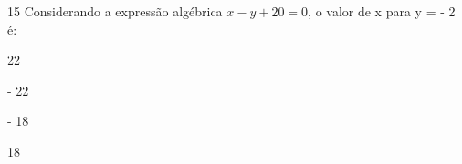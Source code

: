 
\num{15} Considerando a expressão algébrica $x - y + 20 = 0$, o valor de x
para y = - 2 é:

\begin{escolha}
\item 22
\item - 22
\item - 18
\item 18
\end{escolha}




\pagebreak

\mbox{}


